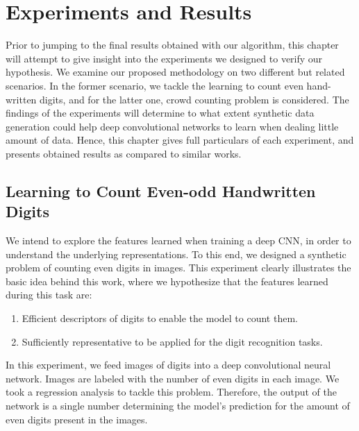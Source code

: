 \newpage
\chapter{Experiments and Results}
\label{sec:experiments}

Prior to jumping to the final results obtained with our algorithm, this chapter will attempt to give insight into the experiments we designed to verify our hypothesis. We examine our proposed methodology on two different but related scenarios. In the former scenario, we tackle the learning to count even hand-written digits, and for the latter one, crowd counting problem is considered. The findings of the experiments will determine to what extent synthetic data generation could help deep convolutional networks to learn when dealing little amount of data. Hence, this chapter gives full particulars of each experiment, and presents obtained results as compared to similar works.

\section{Learning to Count Even-odd Handwritten Digits}

We intend to explore the features learned when training a deep CNN, in order to understand the underlying representations. To this end, we designed a synthetic problem of counting even digits in images. This experiment clearly illustrates the basic idea behind this work, where we hypothesize that the features learned during this task are:
\begin{enumerate}
\item Efficient descriptors of digits to enable the model to count them.
\item Sufficiently representative to be applied for the digit recognition tasks. 
\end{enumerate}

In this experiment, we feed images of digits into a deep convolutional neural network. Images are labeled with the number of even digits in each image. We took a regression analysis to tackle this problem. Therefore, the output of the network is a single number determining the model's prediction for the amount of even digits present in the images. 
 


